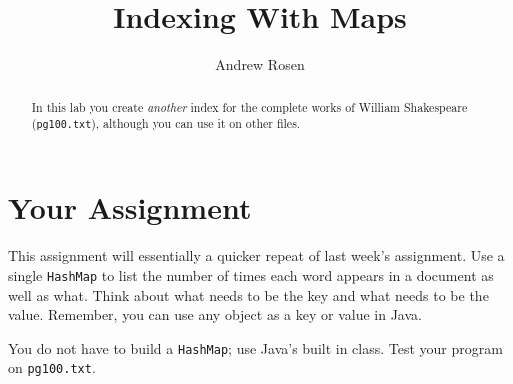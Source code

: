 \documentclass[10pt,letterpaper]{article}
\author{Andrew Rosen}
\title{Indexing With Maps}
\date{}
\begin{document}
	
	\maketitle
	
	\begin{abstract}
		In this lab you create \textit{another} index for the complete works of William Shakespeare (\texttt{pg100.txt}), although you can use it on other files.
	\end{abstract}



	\section{Your Assignment}
	This assignment will essentially a quicker repeat of last week's assignment.
	Use a single \texttt{HashMap} to list the number of times each word appears in a document as well as what.
	Think about what needs to be the key and what needs to be the value.  
	Remember, you can use any object as a key or value in Java.

	You do not have to build a \texttt{HashMap}; use Java's built in class.
	Test your program on \texttt{pg100.txt}.
	
	
	
\end{document}
